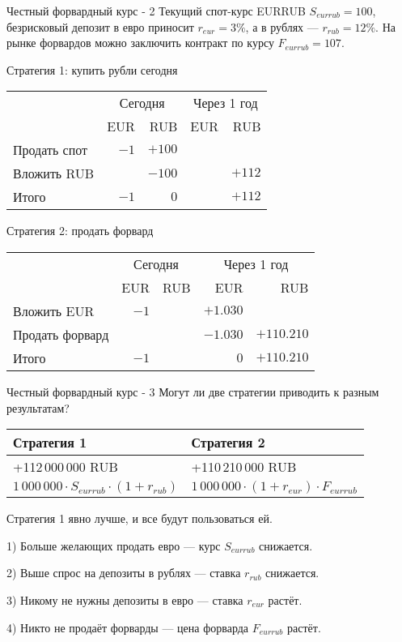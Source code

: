 \documentclass{beamer}
\begin{document}
\begin{frame}{Честный форвардный курс - 2}
\justify
Текущий спот-курс EURRUB $S_{eurrub}=100$, безрисковый депозит в евро 
приносит $r_{eur}=3\%$, а в рублях --- $r_{rub}=12\%$. 
На рынке форвардов можно заключить контракт по курсу $F_{eurrub}=107$.

\justify
Стратегия 1: купить рубли сегодня

\centering
\begin{tabular}{l|r|r|r|r}
& \multicolumn{2}{c|}{Сегодня} & \multicolumn{2}{c}{Через 1 год} \\ \cline{2-5}
& EUR & RUB & EUR & RUB \\ \hline
Продать спот & $-1$ & $+100$ & & \\
Вложить RUB & & $-100$ & & $+112$ \\ \hline
Итого & $-1$ & $0$ & & $+112$
\end{tabular}

\justify
Стратегия 2: продать форвард

\centering
\begin{tabular}{l|r|r|r|r}
& \multicolumn{2}{c|}{Сегодня} & \multicolumn{2}{c}{Через 1 год} \\ \cline{2-5}
& EUR & RUB & EUR & RUB \\ \hline
Вложить EUR & $-1$ & & $+1.030$ & \\
Продать форвард &   &   & $-1.030$ & $+110.210$ \\ \hline
Итого & $-1$ &   & $0$ & $+110.210$
\end{tabular}
\end{frame}



\begin{frame}{Честный форвардный курс - 3}
\justify
Могут ли две стратегии приводить к разным результатам?

\justify
\centering
\begin{tabular}{l|l}
Стратегия 1 & Стратегия 2 \\ \hline
+112\,000\,000 RUB  & +110\,210\,000 RUB \\
$1\,000\,000 \cdot S_{eurrub} \cdot (1+r_{rub})$ & $1\,000\,000 \cdot (1+r_{eur}) \cdot F_{eurrub}$
\end{tabular}

\justify
Стратегия 1 явно лучше, и все будут пользоваться ей. 

1) Больше желающих продать евро --- курс $S_{eurrub}$ снижается.

2) Выше спрос на депозиты в рублях --- ставка $r_{rub}$ снижается.

3) Никому не нужны депозиты в евро --- ставка $r_{eur}$ растёт. 

4) Никто не продаёт форварды --- цена форварда $F_{eurrub}$ растёт.
\end{frame}
\end{document}
